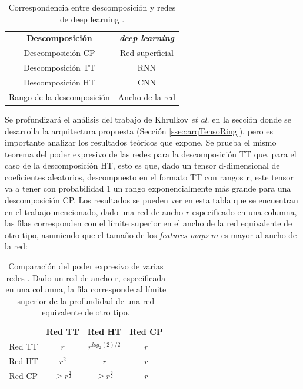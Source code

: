 \documentclass[spanish]{article}
\theoremstyle{definition}
\theoremstyle{remark}
\numberwithin{equation}{section}
\numberwithin{equation}{section} %
\begin{document}
\begin{table}[hbt!]
\centering
 \begin{tabular}{c c} 
 \hline \hline
\textbf{Descomposición} & \textbf{{\it deep learning}} \\  [-1ex]
Descomposición CP & Red superficial \\ [-1ex]
Descomposición TT & RNN \\ [-1ex]
Descomposición HT & CNN \\ [-1ex]
Rango de la descomposición & Ancho de la red \\ 
 \hline \hline
 \end{tabular}
 \caption{Correspondencia entre descomposición y redes de deep learning \cite{khrulkov2017expressive}.}
\end{table}
Se profundizará el análisis del trabajo de Khrulkov \textit{ et al.} en la sección donde se desarrolla la arquitectura propuesta (Sección \ref{ssec:arqTensoRing}), pero es importante analizar los resultados teóricos que expone. Se prueba el mismo teorema del poder expresivo de las redes para la descomposición TT que, para el caso de la descomposición HT, esto es que, dado un tensor d-dimensional de coeficientes aleatorios, descompuesto en el formato TT con rangos $\boldsymbol{r}$, este tensor va a tener con probabilidad 1 un rango exponencialmente más grande para una descomposición CP. Los resultados se pueden ver en esta tabla que se encuentran en el trabajo mencionado, dado una red de ancho $r$ especificado en una columna, las filas corresponden con el límite superior en el ancho de la red equivalente
de otro tipo, asumiendo que el tamaño de los \textit{features maps} $m$ es mayor al ancho de la red: \par
\begin{table}[H]
\centering
 \begin{tabular}{c c c c} 
 \hline \hline
& \textbf{Red TT} & \textbf{Red HT} &  \textbf{Red CP} \\  [-1ex]
Red TT & $r$ & $r^{log_2(2) /2}$ & $r$ \\ [-1ex]
Red HT & $r^2$ & $r$ & $r$ \\ [-1ex]
Red CP & $\geq r^{\frac{d}{2}}$ & $\geq r^{\frac{d}{2}}$ & $r$\\ 
 \hline \hline
 \end{tabular}
 \caption{Comparación del poder expresivo de varias redes \cite{khrulkov2017expressive}. Dado un red de ancho r, especificada en una columna, la fila corresponde al límite superior de la profundidad de una red equivalente de otro tipo. }
\end{table} \par
\end{document}
